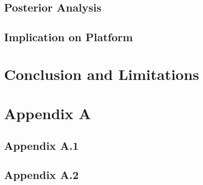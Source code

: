 \documentclass[a4paper, 12pt]{article}
\begin{document}
\subsection{Posterior Analysis}
\subsection{Implication on Platform}
\section{Conclusion and Limitations}

\clearpage



\clearpage
\section*{Appendix A}
\subsection*{Appendix A.1}
\subsection*{Appendix A.2}
\end{document}
